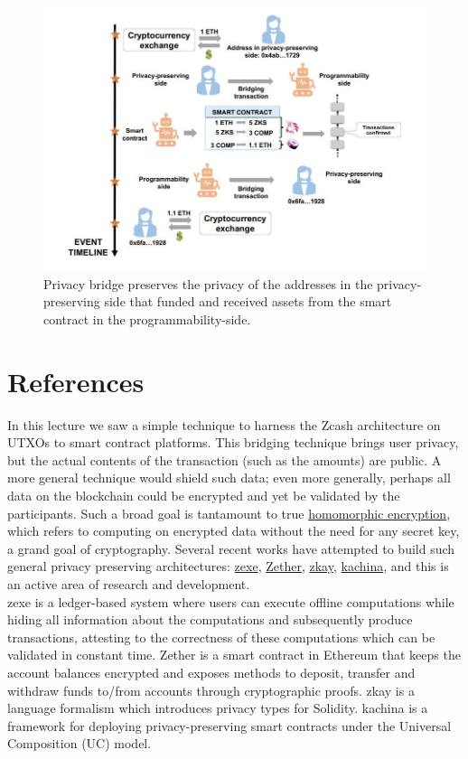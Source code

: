 \begin{center}
	\begin{figure}
		\centering
		\includegraphics[width=0.8\linewidth]{Fig/20/F9}
		\caption{
			Privacy bridge preserves the privacy of the addresses in the privacy-preserving side that funded and received assets from the smart contract in the programmability-side.
		}
		\label{fig:L20_f9}
	\end{figure}
\end{center}
\section{References}
In this lecture we saw a simple technique to harness the Zcash architecture on UTXOs to smart contract platforms. This bridging technique brings user privacy, but the actual contents of the transaction (such as the amounts) are public. A more general technique would shield such data; even more generally, perhaps all data on the blockchain could be encrypted and yet be validated by the participants. Such a broad goal is tantamount to true \href{https://en.wikipedia.org/wiki/Homomorphic_encryption}{homomorphic encryption}, which refers to computing on encrypted data without the need for any secret key, a grand goal of cryptography. Several recent works have attempted to build such general privacy preserving architectures: \href{https://eprint.iacr.org/2018/962.pdf}{zexe}, \href{https://eprint.iacr.org/2019/191}{Zether}, \href{https://github.com/eth-sri/zkay}{zkay}, \href{https://eprint.iacr.org/2020/543}{kachina}, and this is an active area of research and development.\\
zexe is a ledger-based system where users can execute offline computations while hiding all information about the computations and subsequently produce transactions, attesting to the correctness of these computations which can be validated in constant time. Zether is a smart contract in Ethereum that keeps the account balances encrypted and exposes methods to deposit, transfer and withdraw funds to/from accounts through cryptographic proofs. zkay is a language formalism which introduces privacy types for Solidity. kachina is a framework for deploying privacy-preserving smart contracts under the Universal Composition (UC) model.